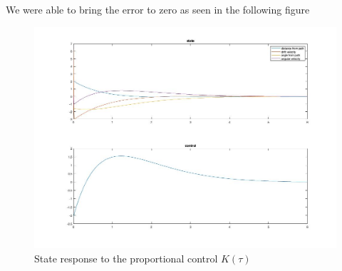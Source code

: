 \documentclass{article}
\begin{document}
We were able to bring the error to zero as seen in the following figure
\begin{figure}[H]
	\centering
    \includegraphics[width=350pt]{graph_new.jpg}
    \caption{State response to the proportional control $K(\tau)$}
    \label{dynamic}
\end{figure}



{}

\end{document}
